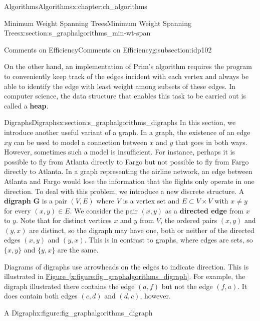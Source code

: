 \documentclass[oneside,10pt,]{book}
\newcommand{\xreffont}{\relax}
\newcommand{\terminology}[1]{\textbf{#1}}
\numberwithin{equation}{section}
\newcommand{\bfG}{\mathbf{G}}
\begin{document}
\begin{chapterptx}{Algorithms}{}{Algorithms}{}{}{x:chapter:ch_algorithms}
\begin{sectionptx}{Minimum Weight Spanning Trees}{}{Minimum Weight Spanning Trees}{}{}{x:section:s_graphalgorithms_min-wt-span}
\begin{subsectionptx}{Comments on Efficiency}{}{Comments on Efficiency}{}{}{g:subsection:idp102}
\par
On the other hand, an implementation of Prim's algorithm requires the program to conveniently keep track of the edges incident with each vertex and always be able to identify the edge with least weight among subsets of these edges. In computer science, the data structure that enables this task to be carried out is called a \terminology{heap}.%
\end{subsectionptx}
\end{sectionptx}
%
%
\typeout{************************************************}
\typeout{************************************************}
%
\begin{sectionptx}{Digraphs}{}{Digraphs}{}{}{x:section:s_graphalgorithms_digraphs}
In this section, we introduce another useful variant of a graph. In a graph, the existence of an edge \(xy\) can be used to model a connection between \(x\) and \(y\) that goes in both ways. However, sometimes such a model is insufficient. For instance, perhaps it is possible to fly from Atlanta directly to Fargo but not possible to fly from Fargo directly to Atlanta. In a graph representing the airline network, an edge between Atlanta and Fargo would lose the information that the flights only operate in one direction. To deal with this problem, we introduce a new discrete structure. A \terminology{digraph} \(\bfG\) is a pair \((V,E)\) where \(V\) is a vertex set and \(E\subset V\times V\) with \(x\neq y\) for every \((x,y)\in E\). We consider the pair \((x,y)\) as a \terminology{directed edge} from \(x\) to \(y\). Note that for distinct vertices \(x\) and \(y\) from \(V\), the ordered pairs \((x,y)\) and \((y,x)\) are distinct, so the digraph may have one, both or neither of the directed edges \((x,y)\) and \((y,x)\). This is in contrast to graphs, where edges are sets, so \(\{x,y\}\) and \(\{y,x\}\) are the same.%
\par
Diagrams of digraphs use arrowheads on the edges to indicate direction.  This is illustrated in \hyperref[x:figure:fig_graphalgorithms_digraph]{Figure~{\xreffont\ref{x:figure:fig_graphalgorithms_digraph}}}. For example, the digraph illustrated there contains the edge \((a,f)\) but not the edge \((f,a)\). It does contain both edges \((c,d)\) and \((d,c)\), however.%
\begin{figureptx}{A Digraph}{x:figure:fig_graphalgorithms_digraph}{}%
\begin{image}{0.075}{0.85}{0.075}%

\end{image}
\end{figureptx}
\end{sectionptx}
\end{chapterptx}
\end{document}
